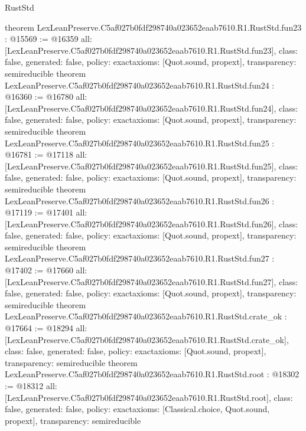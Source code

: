 \begin{lexlean}{RustStd}
\begin{coremodule}
{}
theorem LexLeanPreserve.C5af027b0fdf298740a023652eaab7610.R1.RustStd.fun23 : @15569 := @16359 {
  all: [LexLeanPreserve.C5af027b0fdf298740a023652eaab7610.R1.RustStd.fun23],
  class: false,
  generated: false,
  policy: exact{axioms: [Quot.sound, propext]},
  transparency: semireducible
}
theorem LexLeanPreserve.C5af027b0fdf298740a023652eaab7610.R1.RustStd.fun24 : @16360 := @16780 {
  all: [LexLeanPreserve.C5af027b0fdf298740a023652eaab7610.R1.RustStd.fun24],
  class: false,
  generated: false,
  policy: exact{axioms: [Quot.sound, propext]},
  transparency: semireducible
}
theorem LexLeanPreserve.C5af027b0fdf298740a023652eaab7610.R1.RustStd.fun25 : @16781 := @17118 {
  all: [LexLeanPreserve.C5af027b0fdf298740a023652eaab7610.R1.RustStd.fun25],
  class: false,
  generated: false,
  policy: exact{axioms: [Quot.sound, propext]},
  transparency: semireducible
}
theorem LexLeanPreserve.C5af027b0fdf298740a023652eaab7610.R1.RustStd.fun26 : @17119 := @17401 {
  all: [LexLeanPreserve.C5af027b0fdf298740a023652eaab7610.R1.RustStd.fun26],
  class: false,
  generated: false,
  policy: exact{axioms: [Quot.sound, propext]},
  transparency: semireducible
}
theorem LexLeanPreserve.C5af027b0fdf298740a023652eaab7610.R1.RustStd.fun27 : @17402 := @17660 {
  all: [LexLeanPreserve.C5af027b0fdf298740a023652eaab7610.R1.RustStd.fun27],
  class: false,
  generated: false,
  policy: exact{axioms: [Quot.sound, propext]},
  transparency: semireducible
}
theorem LexLeanPreserve.C5af027b0fdf298740a023652eaab7610.R1.RustStd.crate_ok : @17664 := @18294 {
  all: [LexLeanPreserve.C5af027b0fdf298740a023652eaab7610.R1.RustStd.crate_ok],
  class: false,
  generated: false,
  policy: exact{axioms: [Quot.sound, propext]},
  transparency: semireducible
}
theorem LexLeanPreserve.C5af027b0fdf298740a023652eaab7610.R1.RustStd.root : @18302 := @18312 {
  all: [LexLeanPreserve.C5af027b0fdf298740a023652eaab7610.R1.RustStd.root],
  class: false,
  generated: false,
  policy: exact{axioms: [Classical.choice, Quot.sound, propext]},
  transparency: semireducible
}


\end{coremodule}
\end{lexlean}
